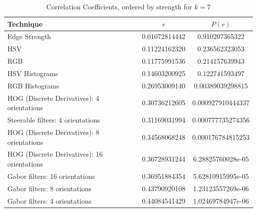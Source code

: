 \begin{table}[h]
\centering
\begin{tabular}{|l|c|c|}\hline
Technique     & $r$ & $P(r)$ \\ \hline
Edge Strength					& 0.01072814442	& 0.910207365322    \\
HSV						& 0.11224162320	& 0.236562323053    \\
RGB						& 0.11775991536	& 0.214157639943    \\
HSV Histograms					& 0.14603200925	& 0.122741593497    \\
RGB Histograms					& 0.26953009140	& 0.00389039298815  \\
HOG (Discrete Derivatives): 4 orientations	& 0.30736212605	& 0.000927910444337 \\
Steerable filters: 4 orientations		& 0.31169031994	& 0.000777735274356 \\
HOG (Discrete Derivatives): 8 orientations	& 0.34568068248	& 0.000176784815253 \\
HOG (Discrete Derivatives): 16 orientations	& 0.36728931244	& 6.28825760028e-05 \\
Gabor filters: 16 orientations			& 0.36951884354	& 5.62810915995e-05 \\
Gabor filters: 8 orientations			& 0.43790920108	& 1.23123557269e-06 \\
Gabor filters: 4 orientations			& 0.44084541429	& 1.02469784947e-06 \\
\hline
\end{tabular}
\caption{Correlation Coefficients, ordered by strength for $k=7$}\label{tab:r-results}
\end{table}



